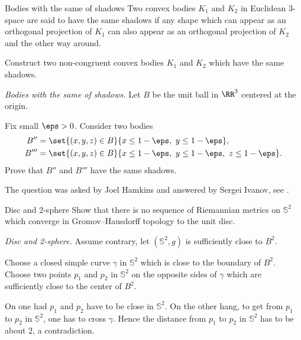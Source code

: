 \begin{pr}{\easy}{Bodies with the same of shadows}\label{Bodies with the same of shadows}
Two convex bodies $K_1$ and $K_2$ in Euclidean 3-space are said to have the same shadows if any shape which can appear as an orthogonal projection of $K_1$ can also appear as an orthogonal projection of $K_2$ and the other way around.

Construct two non-congruent convex bodies $K_1$ and $K_2$ which have the same shadows.
\end{pr}

\textit{Bodies with the same of shadows.}
Let $B$ be the unit ball in $\RR^3$ centered at the origin.

Fix small $\eps>0$.
Consider two bodies 
\begin{align*}
B''&=\set{(x,y,z)\in B}{x\le 1-\eps,\  y\le 1-\eps},
\\ 
B'''&=\set{(x,y,z)\in B}{x\le 1-\eps,\  y\le 1-\eps,\  z\le 1-\eps}.
\end{align*}
Prove that $B''$ and $B'''$ have the same shadows.

 The question was asked by Joel Hamkins and answered by Sergei Ivanov, see \cite{hamkins}.









\begin{pr}{}{Disc and 2-sphere}\label{2-sphere is far from a ball}
Show that there is no sequence of Riemannian metrics on
$\mathbb{S}^2$ which converge in Gromov--Hausdorff topology to the unit disc.
\end{pr}
\textit{Disc and 2-sphere.}
Assume contrary, let $(\mathbb{S}^2,g)$ is sufficiently close to $B^2$.

Choose a closed simple curve $\gamma$ in $\mathbb{S}^2$ which is close to the boundary of $B^2$.
Choose two points $p_1$ and $p_2$ in $\mathbb{S}^2$ 
on the opposite sides of $\gamma$ which are sufficiently close to the center of $B^2$.

On one had $p_1$ and $p_2$ have to be close in $\mathbb{S}^2$.
On the other hang, to get from $p_1$ to $p_2$ in $\mathbb{S}^2$,
one has to cross $\gamma$.
Hence the distance from $p_1$ to $p_2$ in $\mathbb{S}^2$ has to be about $2$,
a contradiction.

